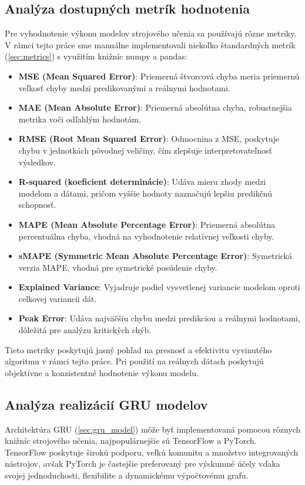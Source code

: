 \subsection{Analýza dostupných metrík hodnotenia}

Pre vyhodnotenie výkonu modelov strojového učenia sa používajú rôzne metriky. V rámci tejto práce sme manuálne implementovali niekoľko štandardných metrík (\ref{sec:metrics}) s využitím knižníc numpy a pandas:

\begin{itemize}
\item \textbf{MSE (Mean Squared Error)}: Priemerná štvorcová chyba meria priemernú veľkosť chyby medzi predikovanými a reálnymi hodnotami.
\item \textbf{MAE (Mean Absolute Error)}: Priemerná absolútna chyba, robustnejšia metrika voči odľahlým hodnotám.
\item \textbf{RMSE (Root Mean Squared Error)}: Odmocnina z MSE, poskytuje chybu v jednotkách pôvodnej veličiny, čím zlepšuje interpretovateľnosť výsledkov.
\item \textbf{R-squared (koeficient determinácie)}: Udáva mieru zhody medzi modelom a dátami, pričom vyššie hodnoty naznačujú lepšiu predikčnú schopnosť.
\item \textbf{MAPE (Mean Absolute Percentage Error)}: Priemerná absolútna percentuálna chyba, vhodná na vyhodnotenie relatívnej veľkosti chyby.
\item \textbf{sMAPE (Symmetric Mean Absolute Percentage Error)}: Symetrická verzia MAPE, vhodná pre symetrické posúdenie chyby.
\item \textbf{Explained Variance}: Vyjadruje podiel vysvetlenej variancie modelom oproti celkovej variancii dát.
\item \textbf{Peak Error}: Udáva najväčšiu chybu medzi predikciou a reálnymi hodnotami, dôležitá pre analýzu kritických chýb.
\end{itemize}

Tieto metriky poskytujú jasný pohľad na presnosť a efektivitu vyvinutého algoritmu v rámci tejto práce. Pri použití na reálnych dátach poskytujú objektívne a konzistentné hodnotenie výkonu modelu.

\subsection{Analýza realizácií GRU modelov}

Architektúra GRU (\ref{sec:gru_model}) môže byť implementovaná pomocou rôznych knižníc strojového učenia, najpopulárnejšie sú TensorFlow a PyTorch. TensorFlow poskytuje širokú podporu, veľkú komunitu a množstvo integrovaných nástrojov, avšak PyTorch je častejšie preferovaný pre výskumné účely vďaka svojej jednoduchosti, flexibilite a dynamickému výpočtovému grafu.

